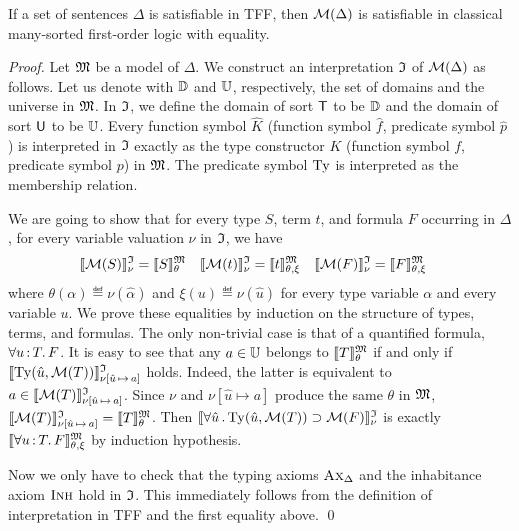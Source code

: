 \begin{theorem} \label{thm:mon_sound}
If a set of sentences $\Delta$ is satisfiable in TFF,
then $\mathcal{M}(\Delta)$ is satisfiable in classical
many-sorted first-order logic with equality.
\end{theorem}
\begin{proof}
Let $\mathfrak{M}$ be a model of $\Delta$.
We construct an interpretation $\mathfrak{I}$ of $\mathcal{M}(\Delta)$ as follows.
Let us denote with $\mathbb{D}$ and $\mathbb{U}$, respectively,
the set of domains and the universe in $\mathfrak{M}$.
In $\mathfrak{I}$, we define the domain of sort $\mathsf{T}$ to be $\mathbb{D}$
and the domain of sort $\mathsf{U}$ to be $\mathbb{U}$.
Every function symbol $\hat{K}$ (function symbol $\hat{f}$,
predicate symbol $\hat{p}$) is interpreted in $\mathfrak{I}$
exactly as the type constructor $K$ (function symbol $f$,
predicate symbol $p$) in $\mathfrak{M}$.
The predicate symbol $\mathrm{Ty}$ is interpreted as the membership relation.

We are going to show that for every type $S$, term $t$,
and formula $F$ occurring in $\Delta$,
for every variable valuation $\nu$ in $\mathfrak{I}$, we have
\begin{align*}
\llbracket \mathcal{M}(S) \rrbracket^{\mathfrak{I}}_{\nu} &= \llbracket S \rrbracket^{\mathfrak{M}}_{\theta} &
\llbracket \mathcal{M}(t) \rrbracket^{\mathfrak{I}}_{\nu} &= \llbracket t \rrbracket^{\mathfrak{M}}_{\theta,\xi} &
\llbracket \mathcal{M}(F) \rrbracket^{\mathfrak{I}}_{\nu} &= \llbracket F \rrbracket^{\mathfrak{M}}_{\theta,\xi}
\end{align*}
where $\theta(\alpha) \eqdef \nu(\hat{\alpha})$ and
$\xi(u) \eqdef \nu(\hat{u})$ for every
type variable $\alpha$ and every variable $u$.
%
We prove these equalities by induction on the structure
of types, terms, and formulas. The only non-trivial case is
that of a quantified formula, $\forall u \operatorname{:} T .\, F$.
It is easy to see that any $a \in \mathbb{U}$ belongs
to $\llbracket T \rrbracket^{\mathfrak{M}}_\theta$ if and only if
$\llbracket \mathrm{Ty}(\hat{u},\mathcal{M}(T)) \rrbracket^{\mathfrak{I}}_{\nu[\hat{u}\,\mapsto\,a]}$
holds. Indeed, the latter is equivalent to
$a \in \llbracket \mathcal{M}(T) \rrbracket^{\mathfrak{I}}_{\nu[\hat{u}\,\mapsto\,a]}$.
Since $\nu$ and $\nu[\hat{u} \mapsto a]$ produce the same
$\theta$ in $\mathfrak{M}$,
$\llbracket \mathcal{M}(T) \rrbracket^{\mathfrak{I}}_{\nu[\hat{u}\,\mapsto\,a]} =
\llbracket T \rrbracket^{\mathfrak{M}}_\theta$.
Then
$\llbracket \forall \hat{u} \,.\, \mathrm{Ty}(\hat{u},\mathcal{M}(T))
\supset \mathcal{M}(F) \rrbracket^{\mathfrak{I}}_{\nu}$ is exactly
$\llbracket \forall u \operatorname{:} T .\, F \rrbracket^{\mathfrak{M}}_{\theta,\xi}$
by induction hypothesis.

Now we only have to check that the typing axioms
$\text{\sc Ax}_{\Delta}$ and the inhabitance axiom $\text{\sc Inh}$ hold in $\mathfrak{I}$.
This immediately follows from the definition of
interpretation in TFF and the first equality above.
\qed
\end{proof}

